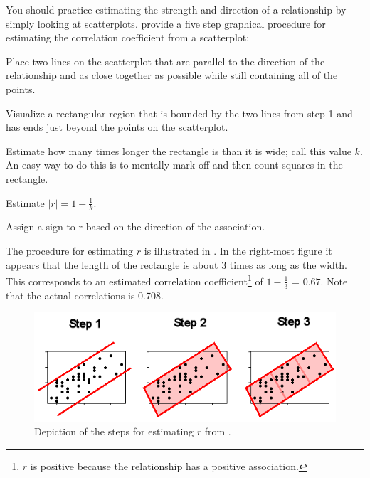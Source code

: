 \documentclass[10pt,openany]{book}\usepackage[]{graphicx}\usepackage[]{color}
\begin{document}

\begin{minipage}{\textwidth}
You should practice estimating the strength and direction of a relationship by simply looking at scatterplots.  \cite{JohnsonKuby2000} provide a five step graphical procedure for estimating the correlation coefficient from a scatterplot:
\begin{Enumerate}
  \item Place two lines on the scatterplot that are parallel to the direction of the relationship and as close together as possible while still containing all of the points.
  \item Visualize a rectangular region that is bounded by the two lines from step 1 and has ends just beyond the points on the scatterplot.
  \item Estimate how many times longer the rectangle is than it is wide; call this value $k$.  An easy way to do this is to mentally mark off and then count squares in the rectangle.
  \item Estimate $|r|=1-\frac{1}{k}$.
  \item Assign a sign to r based on the direction of the association.
\end{Enumerate}
\end{minipage}

The \cite{JohnsonKuby2000} procedure for estimating $r$ is illustrated in .  In the right-most figure it appears that the length of the rectangle is about 3 times as long as the width.  This corresponds to an estimated correlation coefficient\footnote{$r$ is positive because the relationship has a positive association.} of $1-\frac{1}{3}$ = $0.67$.  Note that the actual correlations is 0.708.

\begin{figure}[htbp]
  \centering
    \includegraphics[width=4.5in]{Figs/CorrJK.png}
  \caption{Depiction of the steps for estimating $r$ from \cite{JohnsonKuby2000}.}
  \label{fig:corrjk}
\end{figure}
\end{document}
